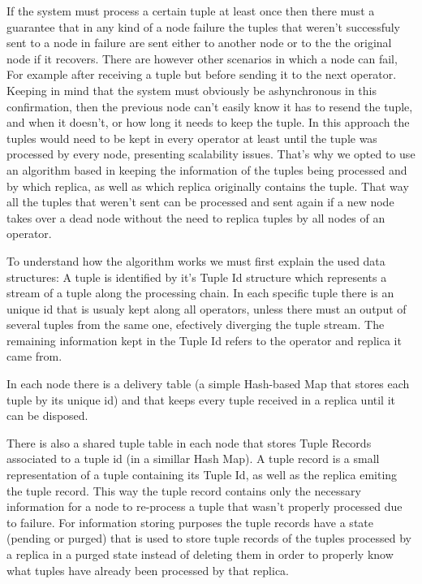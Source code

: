 \documentclass[times, 10pt,twocolumn]{article}
\begin{document}
If the system must process a certain tuple at least once then there must a
guarantee that in any kind of a node failure the tuples that weren't
successfuly sent to a node in failure are sent either to another node or
to the the original node if it recovers. There are however other scenarios
in which a node can fail, For example after receiving a tuple but before
sending it to the next operator. Keeping in mind that the system must
obviously be ashynchronous in this confirmation, then the previous node
can't easily know it has to resend the tuple, and when it doesn't, or how
long it needs to keep the tuple.  In this approach the tuples would need
to be kept in every operator at least until the tuple was processed by
every node, presenting scalability issues. That's why we opted to use an
algorithm based in keeping the information of the tuples being processed
and by which replica, as well as which replica originally contains the
tuple.  That way all the tuples that weren't sent can be processed and
sent again if a new node takes over a dead node without the need to
replica tuples by all nodes of an operator.



To understand how the algorithm works we must first explain the used data
structures: A tuple is identified by it's Tuple Id structure which
represents a stream of a tuple along the processing chain. In each
specific tuple there is an unique id that is usualy kept along all
operators, unless there must an output of several tuples from the same
one, efectively diverging the tuple stream.  The remaining information
kept in the Tuple Id refers to the operator and replica it came from. 

In each node there is a delivery table (a simple Hash-based Map that
stores each tuple by its unique id) and that keeps every tuple received in
a replica until it can be disposed.  

There is also a shared tuple table in each node that stores Tuple Records
associated to a tuple id (in a simillar Hash Map). A tuple record is a
small representation of a tuple containing its Tuple Id, as well as the
replica emiting the tuple record. This way the tuple record contains only
the necessary information for a node to re-process a tuple that wasn't
properly processed due to failure. For information storing purposes the
tuple records have a state (pending or purged) that is used to store tuple
records of the tuples processed by a replica in a purged state instead of
deleting them in order to properly know what tuples have already been
processed by that replica.
\end{document}
